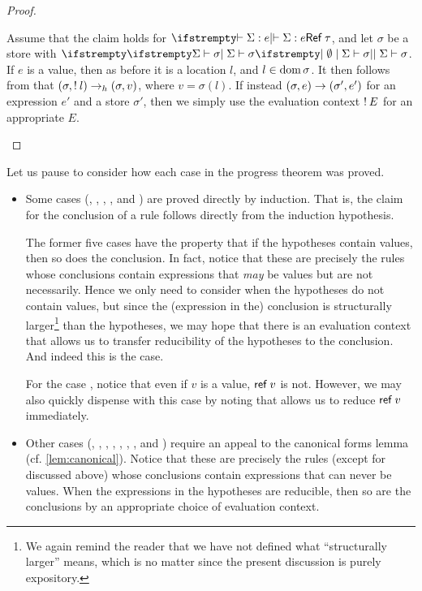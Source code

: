 \begin{proof}
\begin{proofsec}
    \item[\ruleref{Tload}]
    Assume that the claim holds for $\typerel{}{}{\Sigma}{e}{\typeRef{\tau}}$, and let $\sigma$ be a store with $\stotype{}{}{\Sigma}{\sigma}$. If $e$ is a value, then as before it is a location $l$, and $l \in \operatorname{dom}{\sigma}$. It then follows from  that $(\sigma, \mathsf{!}\: l) \to_h (\sigma,v)$, where $v = \sigma(l)$. If instead $(\sigma,e) \to (\sigma',e')$ for an expression $e'$ and a store $\sigma'$, then we simply use the evaluation context $\mathsf{!}\: E$ for an appropriate $E$.
\end{proofsec}
\end{proof}

Let us pause to consider how each case in the progress theorem was proved.
%
\begin{itemize}
    \item Some cases (, , , ,  and ) are proved directly by induction. That is, the claim for the conclusion of a rule follows directly from the induction hypothesis.
    
    The former five cases have the property that if the hypotheses contain values, then so does the conclusion. In fact, notice that these are precisely the rules whose conclusions contain expressions that \emph{may} be values but are not necessarily. Hence we only need to consider when the hypotheses do not contain values, but since the (expression in the) conclusion is structurally larger\footnote{We again remind the reader that we have not defined what \enquote{structurally larger} means, which is no matter since the present discussion is purely expository.} than the hypotheses, we may hope that there is an evaluation context that allows us to transfer reducibility of the hypotheses to the conclusion. And indeed this is the case.

    For the case , notice that even if $v$ is a value, $\mathsf{ref}\: v$ is not. However, we may also quickly dispense with this case by noting that  allows us to reduce $\mathsf{ref}\: v$ immediately.

    \item Other cases (, , , , , , ,  and ) require an appeal to the canonical forms lemma (cf. \cref{lem:canonical}). Notice that these are precisely the rules (except for  discussed above) whose conclusions contain expressions that can never be values. When the expressions in the hypotheses are reducible, then so are the conclusions by an appropriate choice of evaluation context.
    

\end{itemize}
